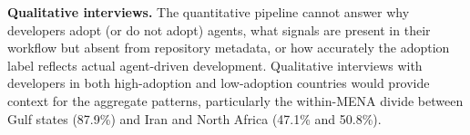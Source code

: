 \textbf{Qualitative interviews.} The quantitative pipeline cannot answer why developers adopt (or do not adopt) agents, what signals are present in their workflow but absent from repository metadata, or how accurately the adoption label reflects actual agent-driven development. Qualitative interviews with developers in both high-adoption and low-adoption countries would provide context for the aggregate patterns, particularly the within-MENA divide between Gulf states (87.9\%) and Iran and North Africa (47.1\% and 50.8\%).
